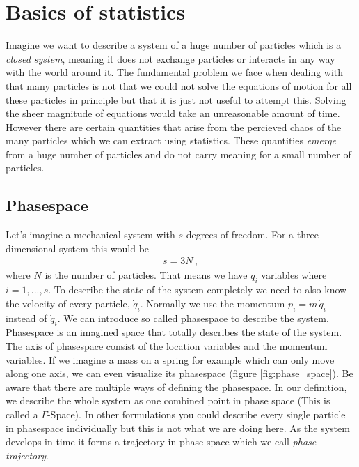 \chapter{Basics of statistics}
Imagine we want to describe a system of a huge number of particles which is a \textit{closed system}, meaning it does not exchange particles or interacts in any way with the world around it.
The fundamental problem we face when dealing with that many particles is not that we could not solve the equations of motion for all these particles in principle but that it is just not useful to attempt this. Solving the sheer magnitude of equations would take an unreasonable amount of time.
\newline However there are certain quantities that arise from the percieved chaos of the many particles which we can extract using statistics. These quantities \textit{emerge} from a huge number of particles and do not carry meaning for a small number of particles.

\section{Phasespace}
Let's imagine a mechanical system with $s$ degrees of freedom. For a three dimensional system this would be
\begin{align}
	s=3N\,,
\end{align}
where $N$ is the number of particles. 
That means we have $q_i$ variables where $i=1,...,s$.
To describe the state of the system completely we need to also know the velocity of every particle, $\dot{q}_i$.
Normally we use the momentum $p_i=m\,\dot{q}_i$ instead of  $\dot{q}_i$. 
We can introduce so called phasespace to describe the system. Phasespace is an imagined space that totally describes the state of the system. The axis of phasespace consist of the location variables and the momentum variables. If we imagine a mass on a spring for example which can only move along one axis, we can even visualize its phasespace (figure \ref{fig:phase_space}).
\label{fig:phase_space}
Be aware that there are multiple ways of defining the phasespace. In our definition, we describe the whole system as one combined point in phase space (This is called a $\Gamma$-Space). In other formulations you could describe every single particle in phasespace individually but this is not what we are doing here. As the system develops in time it forms a trajectory in phase space which we call \textit{phase trajectory}.

